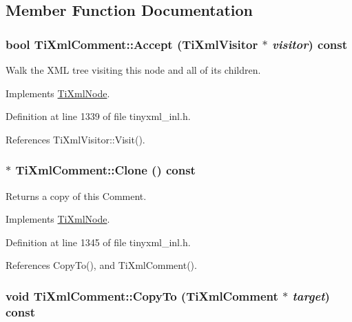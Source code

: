 \subsection{Member Function Documentation}
\hypertarget{class_ti_xml_comment_a4382de0e50da973f11a23ea5852568bd}{
\subsubsection[{Accept}]{\setlength{\rightskip}{0pt plus 5cm}bool TiXmlComment::Accept ({\bf TiXmlVisitor} $\ast$ {\em visitor}) const}}
\label{class_ti_xml_comment_a4382de0e50da973f11a23ea5852568bd}
Walk the XML tree visiting this node and all of its children. 

Implements \hyperlink{class_ti_xml_node_acc0f88b7462c6cb73809d410a4f5bb86}{TiXmlNode}.

Definition at line 1339 of file tinyxml\_\-inl.h.

References TiXmlVisitor::Visit().\hypertarget{class_ti_xml_comment_a4f6590c9c9a2b63a48972655b78eb853}{
\subsubsection[{Clone}]{ $\ast$ TiXmlComment::Clone () const}}
\label{class_ti_xml_comment_a4f6590c9c9a2b63a48972655b78eb853}


Returns a copy of this Comment. 

Implements \hyperlink{class_ti_xml_node_a4508cc3a2d7a98e96a54cc09c37a78a4}{TiXmlNode}.

Definition at line 1345 of file tinyxml\_\-inl.h.

References CopyTo(), and TiXmlComment().\hypertarget{class_ti_xml_comment_a3175b2f27628f4fb7a043897930cd934}{
\subsubsection[{CopyTo}]{\setlength{\rightskip}{0pt plus 5cm}void TiXmlComment::CopyTo ({\bf TiXmlComment} $\ast$ {\em target}) const}}
\label{class_ti_xml_comment_a3175b2f27628f4fb7a043897930cd934}


